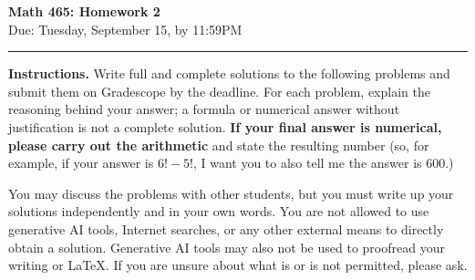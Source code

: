 \documentclass[11pt]{article}
\newcommand{\duedate}{Tuesday, September 15, by 11:59PM}
\begin{document}
\begin{center}{\Large\bfseries Math 465: Homework 2}\\[4pt]{\large Due: \duedate}\end{center}
\hrule\vspace{0.8em}
\textbf{Instructions.} Write full and complete solutions to the following problems and submit them on
Gradescope by the deadline. For each problem, explain the reasoning behind your
answer; a formula or numerical answer without justification is not a complete
solution. \textbf{If your final answer is numerical, please carry out the
arithmetic} and state the resulting number (so, for example, if your answer is
$6!-5!$, I want you to also tell me the answer is $600$.)

You may discuss the problems with other students, but you must write up your
solutions independently and in your own words. You are not allowed to use
generative AI tools, Internet searches, or any other external means to directly
obtain a solution. Generative AI tools may also not be used to proofread your
writing or \LaTeX. If you are unsure about what is or is not permitted, please ask.
\end{document}

